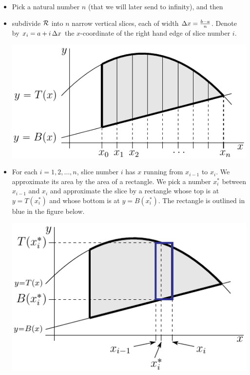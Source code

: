 \begin{itemize}
\item 
Pick a natural number $n$ (that we will later send to infinity), and then 
\item 
subdivide $\mathcal{R}$ into $n$ narrow vertical slices, each of width 
$\Delta x=\frac{b-a}{n}$. Denote by $x_i = a + i\,\Delta x$ the $x$-coordinate 
of the right hand edge of slice number $i$.
\begin{efig}
\begin{center}
   \includegraphics{vSliceB.pdf}
\end{center}
\end{efig}
\item 
For each $i=1,2,\dots,n$, slice number $i$ has $x$ running from $x_{i-1}$ 
to $x_i$. We approximate its area by the area of a rectangle. 
We pick a number $x_i^*$ between $x_{i-1}$ and $x_i$ and approximate the 
slice by a rectangle whose top is at $y=T(x_i^*)$ 
and whose bottom is at $y=B(x_i^*)$. The rectangle is outlined in blue in the 
figure below.
\begin{efig}
\begin{center}
   \includegraphics{vSliceC.pdf}
\end{center}

\end{efig}
\end{itemize}
